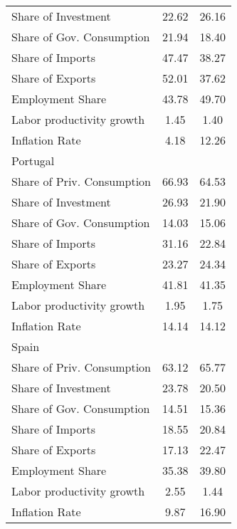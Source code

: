 \begin{center}
\begin{longtable}{lcc}
Share of Investment &     22.62 &     26.16 \\  
Share of Gov. Consumption &     21.94 &     18.40 \\  
Share of Imports &     47.47 &     38.27 \\  
Share of Exports &     52.01 &     37.62 \\  
Employment Share &     43.78 &     49.70 \\  
Labor productivity growth &      1.45 &      1.40 \\  
Inflation Rate &      4.18 &     12.26 \\  
Portugal &  &  \\  
Share of Priv. Consumption &     66.93 &     64.53 \\  
Share of Investment &     26.93 &     21.90 \\  
Share of Gov. Consumption &     14.03 &     15.06 \\  
Share of Imports &     31.16 &     22.84 \\  
Share of Exports &     23.27 &     24.34 \\  
Employment Share &     41.81 &     41.35 \\  
Labor productivity growth &      1.95 &      1.75 \\  
Inflation Rate &     14.14 &     14.12 \\  
Spain &  &  \\  
Share of Priv. Consumption &     63.12 &     65.77 \\  
Share of Investment &     23.78 &     20.50 \\  
Share of Gov. Consumption &     14.51 &     15.36 \\  
Share of Imports &     18.55 &     20.84 \\  
Share of Exports &     17.13 &     22.47 \\  
Employment Share &     35.38 &     39.80 \\  
Labor productivity growth &      2.55 &      1.44 \\  
Inflation Rate &      9.87 &     16.90 \\  
\hline \hline \end{longtable} 
\end{center}
